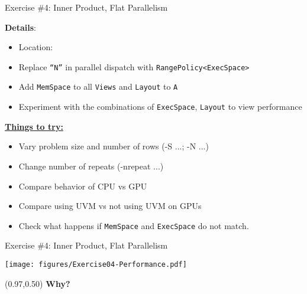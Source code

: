 \begin{frame}[fragile]{Exercise \#4: Inner Product, Flat Parallelism}

  \textbf{Details}:
  \begin{small}
  \begin{itemize}
\item Location: 
\item Replace \texttt{``N''} in parallel dispatch with \texttt{RangePolicy<ExecSpace>}
\item Add \texttt{MemSpace} to all \texttt{Views} and \texttt{Layout} to \texttt{A}
\item Experiment with the combinations of \texttt{ExecSpace}, \texttt{Layout} to view performance
\end{itemize}
  \end{small}


\ul{\textbf{Things to try:}}
  \begin{small}
  \begin{itemize}
  \item Vary problem size and number of rows (-S ...; -N ...)
  \item Change number of repeats (-nrepeat ...)
  \item Compare behavior of CPU vs GPU
  \item Compare using UVM vs not using UVM on GPUs
  \item Check what happens if \texttt{MemSpace} and \texttt{ExecSpace} do not match.
  \end{itemize}
  \end{small}
\end{frame}


\begin{frame}[fragile]{Exercise \#4: Inner Product, Flat Parallelism}


  \vspace{-10pt}

    \texttt{[image: figures/Exercise04-Performance.pdf]}

  \vspace{-15pt}

  \begin{textblock*}{0.5\textwidth}(0.97\textwidth,0.50\textheight)
    \textbf{\LARGE Why?}
  \end{textblock*}

\end{frame}


